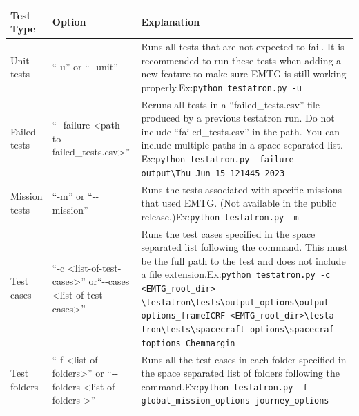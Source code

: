 \documentclass[11pt]{article}
\begin{document}
\begin{table}[H]
	\begin{small}
		\begin{tabularx}{\linewidth} { >{\arraybackslash} l >{\arraybackslash}p{17em} >{\arraybackslash} X}
			\hline
			Test Type & Option & Explanation \\
			\hline 
			Unit tests & ``-u'' or ``-{}-unit'' & Runs all tests that are not expected to fail. It is recommended to run these tests when adding a new feature to make sure EMTG is still working properly.\newline\newline Ex:\newline \texttt{python testatron.py -u} \\
 			\hline
			Failed tests & ``-{}-failure \textless path-to-failed\_tests.csv\textgreater'' & Reruns all tests in a ``failed\_tests.csv'' file produced by a previous testatron run. Do not include ``failed\_tests.csv'' in the path. You can include multiple paths in a space separated list. \newline\newline Ex:\newline \texttt{python testatron.py --failure output\textbackslash Thu\_Jun\_15\_121445\_2023} \\
 			\hline
			Mission tests & ``-m'' or ``-{}-mission'' & Runs the tests associated with specific missions that used EMTG. (Not available in the public release.)\newline\newline Ex:\newline \texttt{python testatron.py -m} \\
			\hline
			Test cases & ``-c \textless list-of-test-cases\textgreater'' or\newline ``-{}-cases \textless list-of-test-cases\textgreater'' & Runs the test cases specified in the space separated list following the command. This must be the full path to the test and does not include a file extension.\newline\newline Ex:\newline \texttt{python testatron.py -c <EMTG\_root\_dir> \textbackslash testatron\textbackslash tests\textbackslash output\_options\textbackslash output options\_frameICRF <EMTG\_root\_dir>\textbackslash testa tron\textbackslash tests\textbackslash spacecraft\_options\textbackslash spacecraf toptions\_Chemmargin} \\
			\hline
			Test folders & ``-f \textless list-of-folders\textgreater'' or \newline``-{}-folders \textless list-of-folders \textgreater'' & Runs all the test cases in each folder specified in the space separated list of folders following the command.\newline\newline Ex:\newline\texttt{python testatron.py -f global\_mission\_options journey\_options} \\

\end{tabularx}
\end{small}
\end{table}
\end{document}
